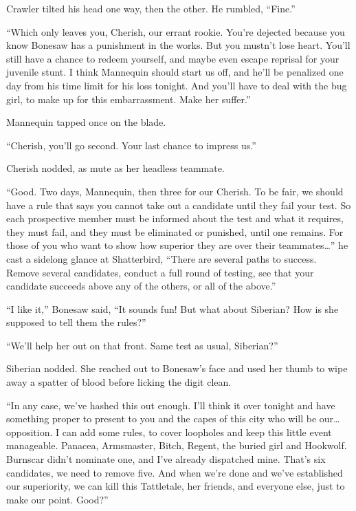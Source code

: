 Crawler tilted his head one way, then the other.  He rumbled, ``Fine.''



``Which only leaves you, Cherish, our errant rookie.  You're dejected because you know Bonesaw has a punishment in the works.  But you mustn't lose heart.  You'll still have a chance to redeem yourself, and maybe even escape reprisal for your juvenile stunt.  I think Mannequin should start us off, and he'll be penalized one day from his time limit for his loss tonight.  And you'll have to deal with the bug girl, to make up for this embarrassment.   Make her suffer.''



Mannequin tapped once on the blade.



``Cherish, you'll go second.  Your last chance to impress us.''



Cherish nodded, as mute as her headless teammate.



``Good.  Two days, Mannequin, then three for our Cherish.  To be fair, we should have a rule that says you cannot take out a candidate until they fail your test.  So each prospective member must be informed about the test and what it requires, they must fail, and they must be eliminated or punished, until one remains.  For those of you who want to show how superior they are over their teammates\ldots'' he cast a sidelong glance at Shatterbird, ``There are several paths to success.  Remove several candidates, conduct a full round of testing, see that your candidate succeeds above any of the others, or all of the above.''



``I like it,'' Bonesaw said, ``It sounds fun!  But what about Siberian?  How is she supposed to tell them the rules?''



``We'll help her out on that front.  Same test as usual, Siberian?''



Siberian nodded.  She reached out to Bonesaw's face and used her thumb to wipe away a  spatter of blood before licking the digit clean.



``In any case, we've hashed this out enough.  I'll think it over tonight and have something proper to present to you and the capes of this city who will be our\ldots opposition.  I can add some rules, to cover loopholes and keep this little event manageable.  Panacea, Armsmaster, Bitch, Regent, the buried girl and Hookwolf.  Burnscar didn't nominate one, and I've already dispatched mine.  That's six candidates, we need to remove five.  And when we're done and we've established our superiority, we can kill this Tattletale, her friends, and everyone else, just to make our point.  Good?''



